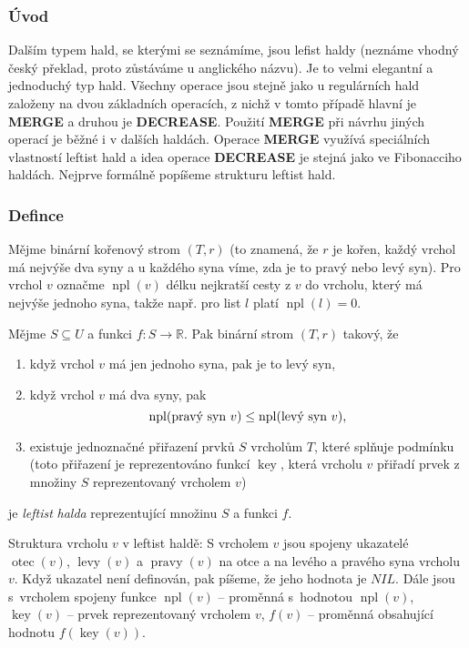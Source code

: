 \documentclass[a4paper,12pt]{article}
\DeclareMathOperator*{\otec}{otec}
\DeclareMathOperator*{\levy}{levy}
\DeclareMathOperator*{\pravy}{pravy}
\DeclareMathOperator*{\key}{key}
\DeclareMathOperator*{\npl}{npl}
\begin{document}
\subsubsection{Úvod}
Dalším typem hald, se kterými se seznámíme, jsou lefist 
haldy (neznáme vhodný český překlad, proto zůstáváme 
u anglického názvu). Je to velmi elegantní a jednoduchý typ 
hald. Všechny operace jsou stejně jako u regulárních hald 
založeny na 
dvou základních operacích, z nichž v tomto případě hlavní je {\bf MERGE} a  
druhou je {\bf DECREASE}. Použití {\bf MERGE }
při návrhu jiných operací je běžné i v dalších haldách. 
Operace {\bf MERGE} využívá speciálních vlastností leftist 
hald a idea operace {\bf DECREASE} je stejná jako ve 
Fibonacciho haldách. Nejprve formálně popíšeme strukturu 
leftist hald. 

\subsubsection{Defince}

Mějme binární kořenový strom $(T,r)$ (to znamená, že $
r$ je kořen, 
každý vrchol má nejvýše dva syny a u každého syna 
víme, zda je to pravý nebo levý syn). Pro vrchol $v$ 
označme $\npl(v)$ délku nejkratší cesty z $v$ do vrcholu, který má 
nejvýše jednoho syna, takže např. pro list $l$ platí $\npl
(l)=0$. 

Mějme $S\subseteq U$ a funkci $f:S\to\mathbb R$. Pak binární strom 
$(T,r)$ takový, že
\begin{enumerate}
\item
když vrchol $v$ má jen jednoho syna, pak je to levý syn,
\item
když vrchol $v$ má dva syny, pak 
$$\npl(\text{\rm pravý syn }v)\le\npl(\text{\rm levý syn }v),$$
\item
existuje jednoznačné přiřazení prvků $S$  
vrcholům $T$, které splňuje podmínku  
(toto přiřazení 
je reprezentováno funkcí $\key$, která vrcholu $v$ přiřadí prvek 
z množi\-ny $S$ reprezentovaný vrcholem $v$)
\end{enumerate}
je \emph{leftist} \emph{halda} 
reprezentující množinu $S$ a funkci $f$. 

Struktura vrcholu $v$ v leftist haldě:\newline 
S vrcholem $v$ jsou 
spojeny ukazatelé $\otec(v)$, $\levy(v)$ a $\pravy(v)$ na otce a 
na levého a pravého syna vrcholu $v$.  
Když ukazatel není definován, pak píšeme, že jeho hodnota je 
$NIL$.  Dále jsou s~vrcholem spojeny funkce\newline 
$\npl(v)$ -- proměnná s~hodnotou $\npl(v)$,\newline 
$\key(v)$ -- prvek reprezentovaný vrcholem $v$,\newline 
$f(v)$ -- proměnná obsahující hodnotu $f(\key(v))$.
\end{document}
